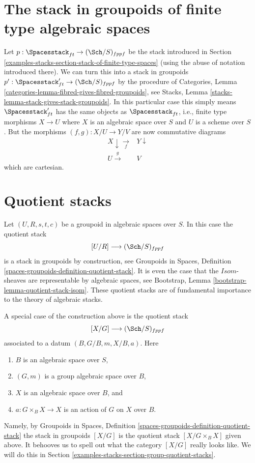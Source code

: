 \section{The stack in groupoids of finite type algebraic spaces}
\label{examples-stacks-section-stack-in-groupoids-of-finite-type-spaces}
Let $p : \Spacesstack_{ft} \to (\Sch/S)_{fppf}$ be the stack
introduced in
Section \ref{examples-stacks-section-stack-of-finite-type-spaces}
(using the abuse of notation introduced there).
We can turn this into a stack in groupoids
$p' : \Spacesstack_{ft}' \to (\Sch/S)_{fppf}$ by
the procedure of
Categories, Lemma \ref{categories-lemma-fibred-gives-fibred-groupoids},
see
Stacks, Lemma \ref{stacks-lemma-stack-gives-stack-groupoids}.
In this particular case this simply means $\Spacesstack_{ft}'$
has the same objects as $\Spacesstack_{ft}$, i.e., finite type morphisms
$X \to U$ where $X$ is an algebraic space over $S$ and $U$ is a scheme
over $S$. But the morphisms $(f, g) : X/U \to Y/V$ are now
commutative diagrams
$$
\begin{array}{cc}X \downarrow\underset{f}{\longrightarrow} & Y \downarrow \\ U \overset{g}{\longrightarrow} & V\end{array}
$$
which are cartesian.

\section{Quotient stacks}
\label{examples-stacks-section-quotient-stacks}
Let $(U, R, s, t, c)$ be a groupoid in algebraic spaces over $S$.
In this case the quotient stack
$$
[U/R] \longrightarrow (\Sch/S)_{fppf}
$$
is a stack in groupoids by construction, see
Groupoids in Spaces,
Definition \ref{spaces-groupoids-definition-quotient-stack}.
It is even the case that the $\mathit{Isom}$-sheaves are
representable by algebraic spaces, see
Bootstrap, Lemma \ref{bootstrap-lemma-quotient-stack-isom}.
These quotient stacks are of fundamental importance to the theory of
algebraic stacks.

\medskip\noindent
A special case of the construction above is the quotient stack
$$
[X/G] \longrightarrow (\Sch/S)_{fppf}
$$
associated to a datum $(B, G/B, m, X/B, a)$. Here
\begin{enumerate}
\item $B$ is an algebraic space over $S$,
\item $(G, m)$ is a group algebraic space over $B$,
\item $X$ is an algebraic space over $B$, and
\item $a : G \times_B X \to X$ is an action of $G$ on $X$ over $B$.
\end{enumerate}
Namely, by
Groupoids in Spaces,
Definition \ref{spaces-groupoids-definition-quotient-stack}
the stack in groupoids $[X/G]$ is the
quotient stack $[X/G \times_B X]$ given above. It behooves us to
spell out what the category $[X/G]$ really looks like. We will do this in
Section \ref{examples-stacks-section-group-quotient-stacks}.

